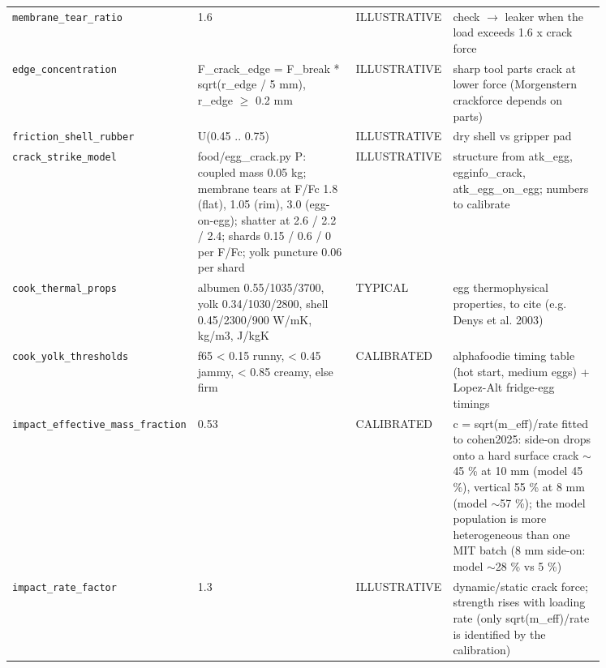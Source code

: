\documentclass[10.5pt,a4paper]{article}
\begin{document}
{\begin{longtable}{@{}p{0.2\linewidth}p{0.27\linewidth}p{0.12\linewidth}p{0.26\linewidth}@{}}
\texttt{membrane\_\allowbreak{}tear\_\allowbreak{}ratio} & 1.6 & ILLUSTRATIVE & check $\to$ leaker when the load exceeds 1.6 x crack force \\
\texttt{edge\_\allowbreak{}concentration} & F\_crack\_edge = F\_break * sqrt(r\_edge / 5 mm), r\_edge $\ge$ 0.2 mm & ILLUSTRATIVE & sharp tool parts crack at lower force (Morgenstern crackforce depends on parts) \\
\texttt{friction\_\allowbreak{}shell\_\allowbreak{}rubber} & U(0.45 .. 0.75) & ILLUSTRATIVE & dry shell vs gripper pad \\
\texttt{crack\_\allowbreak{}strike\_\allowbreak{}model} & food/egg\_crack.py P: coupled mass 0.05 kg; membrane tears at F/Fc 1.8 (flat), 1.05 (rim), 3.0 (egg-on-egg); shatter at 2.6 / 2.2 / 2.4; shards 0.15 / 0.6 / 0 per F/Fc; yolk puncture 0.06 per shard & ILLUSTRATIVE & structure from atk\_egg, egginfo\_crack, atk\_egg\_on\_egg; numbers to calibrate \\
\texttt{cook\_\allowbreak{}thermal\_\allowbreak{}props} & albumen 0.55/1035/3700, yolk 0.34/1030/2800, shell 0.45/2300/900 W/mK, kg/m3, J/kgK & TYPICAL & egg thermophysical properties, to cite (e.g. Denys et al. 2003) \\
\texttt{cook\_\allowbreak{}yolk\_\allowbreak{}thresholds} & f65 < 0.15 runny, < 0.45 jammy, < 0.85 creamy, else firm & CALIBRATED & alphafoodie timing table (hot start, medium eggs) + Lopez-Alt fridge-egg timings \\
\texttt{impact\_\allowbreak{}effective\_\allowbreak{}mass\_\allowbreak{}fraction} & 0.53 & CALIBRATED & c = sqrt(m\_eff)/rate fitted to cohen2025: side-on drops onto a hard surface crack $\sim$45 \% at 10 mm (model 45 \%), vertical 55 \% at 8 mm (model $\sim$57 \%); the model population is more heterogeneous than one MIT batch (8 mm side-on: model $\sim$28 \% vs 5 \%) \\
\texttt{impact\_\allowbreak{}rate\_\allowbreak{}factor} & 1.3 & ILLUSTRATIVE & dynamic/static crack force; strength rises with loading rate (only sqrt(m\_eff)/rate is identified by the calibration) \\\bottomrule\end{longtable}}
\end{document}
